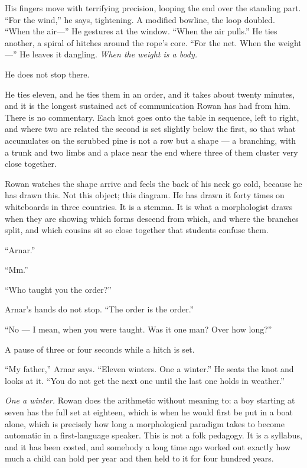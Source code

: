 \documentclass[11pt,oneside]{book}
\begin{document}
His fingers move with terrifying precision, looping the end over the
standing part. ``For the wind,'' he says, tightening. A modified
bowline, the loop doubled. ``When the air---'' He gestures at the
window. ``When the air pulls.'' He ties another, a spiral of hitches
around the rope's core. ``For the net. When the weight---'' He leaves it
dangling. \emph{When the weight is a body.}

He does not stop there.

He ties eleven, and he ties them in an order, and it takes about twenty
minutes, and it is the longest sustained act of communication Rowan has
had from him. There is no commentary. Each knot goes onto the table in
sequence, left to right, and where two are related the second is set
slightly below the first, so that what accumulates on the scrubbed pine
is not a row but a shape --- a branching, with a trunk and two limbs and
a place near the end where three of them cluster very close together.

Rowan watches the shape arrive and feels the back of his neck go cold,
because he has drawn this. Not this object; this diagram. He has drawn
it forty times on whiteboards in three countries. It is a stemma. It is
what a morphologist draws when they are showing which forms descend from
which, and where the branches split, and which cousins sit so close
together that students confuse them.

``Arnar.''

``Mm.''

``Who taught you the order?''

Arnar's hands do not stop. ``The order is the order.''

``No --- I mean, when you were taught. Was it one man? Over how long?''

A pause of three or four seconds while a hitch is set.

``My father,'' Arnar says. ``Eleven winters. One a winter.'' He seats the
knot and looks at it. ``You do not get the next one until the last one
holds in weather.''

\emph{One a winter.} Rowan does the arithmetic without meaning to: a boy
starting at seven has the full set at eighteen, which is when he would
first be put in a boat alone, which is precisely how long a
morphological paradigm takes to become automatic in a first-language
speaker. This is not a folk pedagogy. It is a syllabus, and it has been
costed, and somebody a long time ago worked out exactly how much a child
can hold per year and then held to it for four hundred years.
\end{document}
